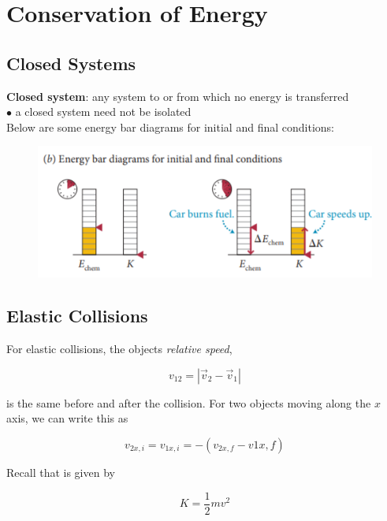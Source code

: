 \section{Conservation of Energy}

    \subsection{Closed Systems}

        \textbf{Closed system}: any system to or from which no energy is transferred \\
        $\bullet$ a closed system need not be isolated \\

        Below are some energy bar diagrams for initial and final conditions:

        \begin{figure}[hbt!]
            \centering
            \includegraphics[]{Resources/Energy_Bar_Closed_System}
        \end{figure}



    \subsection{Elastic Collisions}

        For elastic collisions, the objects \textit{relative speed},

        \[
            v_{12} = |\overrightarrow{v}_2 - \overrightarrow{v}_1|
        \]

        is the same before and after the collision. For two objects moving along the $x$ axis, we can write this as

        \[
            v_{2x,i} = v_{1x,i} = -(v_{2x,f} - v{1x,f})
        \]

        Recall that  is given by

        \[
            K = \frac{1}{2} mv^2
        \]


